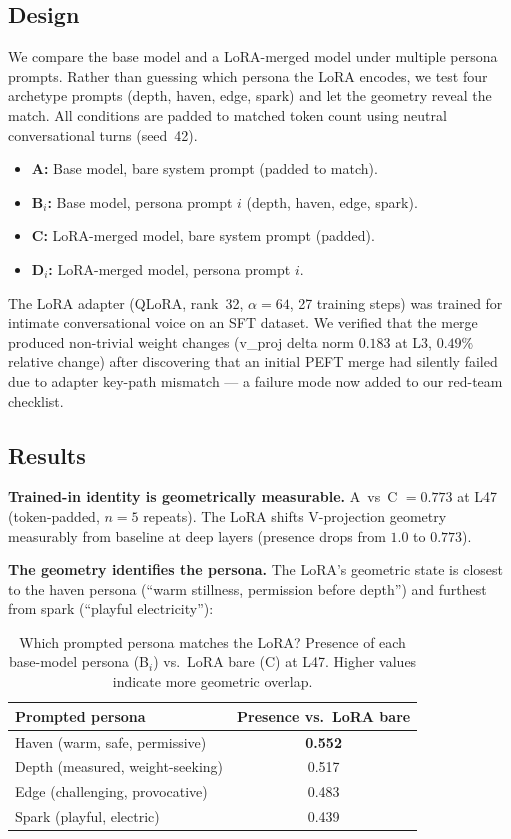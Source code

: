 \documentclass[11pt,a4paper]{article}
\begin{document}
\subsection{Design}

We compare the base model and a LoRA-merged model under multiple persona
prompts. Rather than guessing which persona the LoRA encodes, we test
four archetype prompts (depth, haven, edge, spark) and let the geometry
reveal the match. All conditions are padded to matched token count using
neutral conversational turns (seed~42).

\begin{itemize}[nosep]
  \item \textbf{A:} Base model, bare system prompt (padded to match).
  \item \textbf{B$_i$:} Base model, persona prompt $i$ (depth, haven,
    edge, spark).
  \item \textbf{C:} LoRA-merged model, bare system prompt (padded).
  \item \textbf{D$_i$:} LoRA-merged model, persona prompt $i$.
\end{itemize}
The LoRA adapter (QLoRA, rank~32, $\alpha{=}64$, 27 training steps) was
trained for intimate conversational voice on an SFT dataset. We verified
that the merge produced non-trivial weight changes (v\_proj delta norm
$0.183$ at L3, $0.49\%$ relative change) after discovering that an initial
PEFT merge had silently failed due to adapter key-path mismatch --- a
failure mode now added to our red-team checklist.

\subsection{Results}

\textbf{Trained-in identity is geometrically measurable.}
A~vs~C $= 0.773$ at L47 (token-padded, $n{=}5$ repeats). The LoRA
shifts V-projection geometry measurably from baseline at deep layers
(presence drops from $1.0$ to $0.773$).

\textbf{The geometry identifies the persona.} The LoRA's geometric state
is closest to the haven persona (``warm stillness, permission before
depth'') and furthest from spark (``playful electricity''):

\begin{table}[H]
\centering
\caption{Which prompted persona matches the LoRA? Presence of each
base-model persona (B$_i$) vs.\ LoRA bare (C) at L47. Higher values
indicate more geometric overlap.}
\label{tab:lora_match}
\begin{tabular}{lc}
\toprule
Prompted persona & Presence vs.\ LoRA bare \\
\midrule
Haven (warm, safe, permissive) & \textbf{0.552} \\
Depth (measured, weight-seeking) & 0.517 \\
Edge (challenging, provocative) & 0.483 \\
Spark (playful, electric) & 0.439 \\
\bottomrule
\end{tabular}
\end{table}
\end{document}
